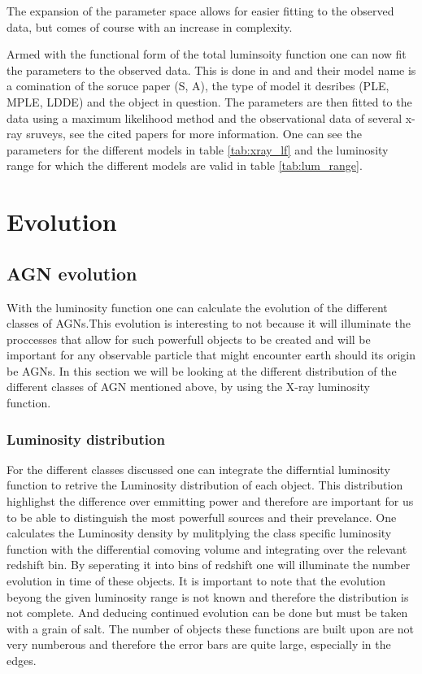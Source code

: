 \documentclass{article}
\begin{document}
 The expansion of the parameter space allows for easier fitting to the observed data, but comes of course with an increase in complexity. 


Armed with the functional form of the total luminsoity function one can now fit the parameters to the observed data. This is done in \cite{Silverman_2008} and \cite{Ajello_2009} and their 
model name is a comination of the soruce paper (S, A), the type of model it desribes (PLE, MPLE, LDDE) and the object in question. The parameters are then fitted to the data using a maximum likelihood method and the observational data of several x-ray sruveys, see the cited papers for more information.
One can see the parameters for the different models in table \ref{tab:xray_lf} and the luminosity range for which the different models are valid in table \ref{tab:lum_range}.





\section{Evolution}



\subsection{AGN evolution}
With the luminosity function one can calculate the evolution of the different classes of AGNs.This evolution is interesting to not because it will 
illuminate the proccesses that allow for such powerfull objects to be created and will be important for any observable particle that 
might encounter earth should its origin be AGNs. In this section we will be looking at the different distribution of the different classes of AGN 
mentioned above, by using the X-ray luminosity function. 


\subsubsection{Luminosity distribution}
 
For the different classes discussed one can integrate the differntial luminosity function to retrive the Luminosity distribution of each 
object. This distribution highlighst the difference over emmitting power and therefore are important for us to be able to distinguish the most powerfull 
sources and their prevelance. One calculates the Luminosity density by mulitplying the class specific luminosity
function with the differential comoving volume and integrating over the relevant redshift bin. By seperating it into
bins of redshift one will illuminate the number evolution in time of these objects. It is important to note 
that the evolution beyong the given luminosity range is not known and therefore the distribution is not complete. And deducing continued evolution
can be done but must be taken with a grain of salt. The number of objects these functions are built upon are not very numberous and therefore
the error bars are quite large, especially in the edges. 
\end{document}
